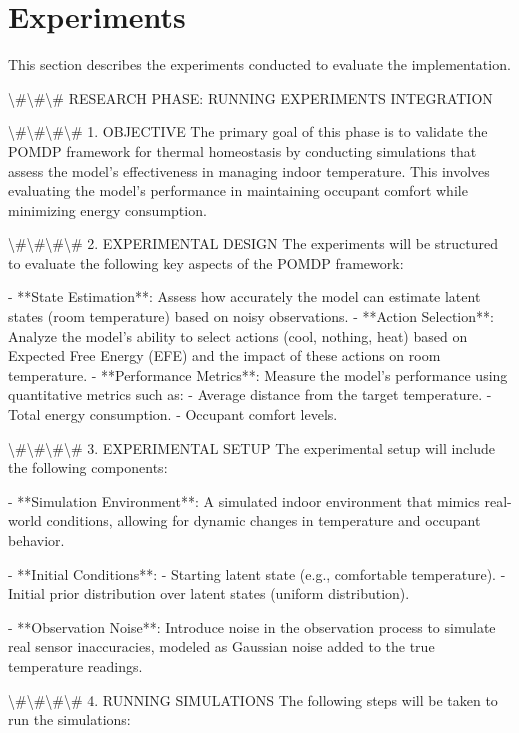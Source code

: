 \documentclass[11pt,a4paper]{article}
\begin{document}
\section{Experiments}

This section describes the experiments conducted to evaluate the implementation.

\textbackslash{}#\textbackslash{}#\textbackslash{}# RESEARCH PHASE: RUNNING EXPERIMENTS INTEGRATION

\textbackslash{}#\textbackslash{}#\textbackslash{}#\textbackslash{}# 1. OBJECTIVE
The primary goal of this phase is to validate the POMDP framework for thermal homeostasis by conducting simulations that assess the model's effectiveness in managing indoor temperature. This involves evaluating the model’s performance in maintaining occupant comfort while minimizing energy consumption.

\textbackslash{}#\textbackslash{}#\textbackslash{}#\textbackslash{}# 2. EXPERIMENTAL DESIGN
The experiments will be structured to evaluate the following key aspects of the POMDP framework:

- **State Estimation**: Assess how accurately the model can estimate latent states (room temperature) based on noisy observations.
- **Action Selection**: Analyze the model's ability to select actions (cool, nothing, heat) based on Expected Free Energy (EFE) and the impact of these actions on room temperature.
- **Performance Metrics**: Measure the model's performance using quantitative metrics such as:
  - Average distance from the target temperature.
  - Total energy consumption.
  - Occupant comfort levels.

\textbackslash{}#\textbackslash{}#\textbackslash{}#\textbackslash{}# 3. EXPERIMENTAL SETUP
The experimental setup will include the following components:

- **Simulation Environment**: A simulated indoor environment that mimics real-world conditions, allowing for dynamic changes in temperature and occupant behavior.

- **Initial Conditions**: 
  - Starting latent state (e.g., comfortable temperature).
  - Initial prior distribution over latent states (uniform distribution).

- **Observation Noise**: Introduce noise in the observation process to simulate real sensor inaccuracies, modeled as Gaussian noise added to the true temperature readings.

\textbackslash{}#\textbackslash{}#\textbackslash{}#\textbackslash{}# 4. RUNNING SIMULATIONS
The following steps will be taken to run the simulations:
\end{document}
